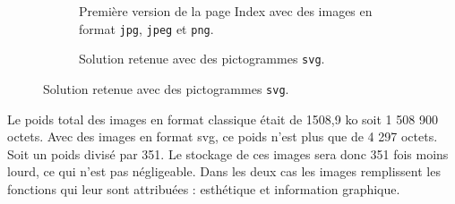 \documentclass[a4paper,12pt,twoside]{book}
\begin{document}
 \begin{figure}[H]
    \centering
    \begin{subfigure}[b]{0.3\linewidth}
      \caption{Première version de la page Index avec des images en format \texttt{jpg}, \texttt{jpeg} et \texttt{png}.}
    \end{subfigure}
    \begin{subfigure}[b]{0.3\linewidth}
      \caption{Solution retenue avec des pictogrammes \texttt{svg}.}
    \end{subfigure}
\end{figure}

Le poids total des images en format classique était de 1508,9 ko soit 1 508 900 octets. Avec des images en format svg, ce poids n'est plus que de 4 297 octets. Soit un poids divisé par 351. Le stockage de ces images sera donc 351 fois moins lourd, ce qui n'est pas négligeable. Dans les deux cas les images remplissent les fonctions qui leur sont attribuées : esthétique et information graphique.
\end{document}
